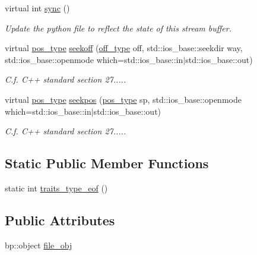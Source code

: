 \begin{DoxyCompactItemize}
virtual int \hyperlink{classecto_1_1py_1_1streambuf_af09b35e1d7da997aacdf99c8802c0fa2}{sync} ()
\begin{DoxyCompactList}\small\item\em Update the python file to reflect the state of this stream buffer. \end{DoxyCompactList}\item 
virtual \hyperlink{classecto_1_1py_1_1streambuf_afdd3f60ff0d0b2f4645742690b7d27dd}{pos\+\_\+type} \hyperlink{classecto_1_1py_1_1streambuf_af30e4b5af87fcc71a7974b1c00721dbb}{seekoff} (\hyperlink{classecto_1_1py_1_1streambuf_aa01772d1599fc51089a209a69fcab7c7}{off\+\_\+type} off, std\+::ios\+\_\+base\+::seekdir way, std\+::ios\+\_\+base\+::openmode which=std\+::ios\+\_\+base\+::in$\vert$std\+::ios\+\_\+base\+::out)
\begin{DoxyCompactList}\small\item\em C.\+f. C++ standard section 27..... \end{DoxyCompactList}\item 
virtual \hyperlink{classecto_1_1py_1_1streambuf_afdd3f60ff0d0b2f4645742690b7d27dd}{pos\+\_\+type} \hyperlink{classecto_1_1py_1_1streambuf_a5763f3ff57fc8044b30a695ad7c403f7}{seekpos} (\hyperlink{classecto_1_1py_1_1streambuf_afdd3f60ff0d0b2f4645742690b7d27dd}{pos\+\_\+type} sp, std\+::ios\+\_\+base\+::openmode which=std\+::ios\+\_\+base\+::in$\vert$std\+::ios\+\_\+base\+::out)
\begin{DoxyCompactList}\small\item\em C.\+f. C++ standard section 27..... \end{DoxyCompactList}\end{DoxyCompactItemize}
\subsection*{Static Public Member Functions}
\begin{DoxyCompactItemize}
\item 
static int \hyperlink{classecto_1_1py_1_1streambuf_ab4446bbe746f4d3713c15492d798872e}{traits\+\_\+type\+\_\+eof} ()
\end{DoxyCompactItemize}
\subsection*{Public Attributes}
\begin{DoxyCompactItemize}
\item 
bp\+::object \hyperlink{classecto_1_1py_1_1streambuf_a63254ed85f60504895f526272e19dd34}{file\+\_\+obj}
\end{DoxyCompactItemize}
